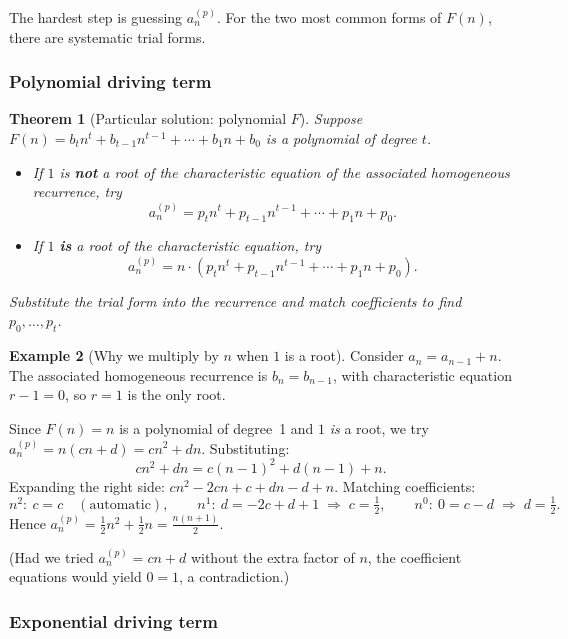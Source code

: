 \documentclass[11pt, a4paper, notitlepage]{report}
\newtheorem{theorem}{Theorem}[section]
\theoremstyle{definition}
\newtheorem{example}[theorem]{Example}
\theoremstyle{remark}
\begin{document}
The hardest step is guessing $a_n^{(p)}$.  For the two most common forms of $F(n)$,
there are systematic trial forms.

\subsubsection{Polynomial driving term}

\begin{theorem}[Particular solution: polynomial $F$]
\label{thm:particular-poly}
Suppose $F(n) = b_t n^t + b_{t-1}n^{t-1} + \cdots + b_1 n + b_0$ is a polynomial of
degree $t$.
\begin{itemize}
  \item If $1$ is \textbf{not} a root of the characteristic equation of the associated
        homogeneous recurrence, try
        \[a_n^{(p)} = p_t n^t + p_{t-1}n^{t-1} + \cdots + p_1 n + p_0.\]
  \item If $1$ \textbf{is} a root of the characteristic equation, try
        \[a_n^{(p)} = n\cdot(p_t n^t + p_{t-1}n^{t-1} + \cdots + p_1 n + p_0).\]
\end{itemize}
Substitute the trial form into the recurrence and match coefficients to find $p_0, \ldots, p_t$.
\end{theorem}

\begin{example}[Why we multiply by $n$ when $1$ is a root]
\label{ex:root1}
Consider $a_n = a_{n-1} + n$.  The associated homogeneous recurrence is $b_n = b_{n-1}$,
with characteristic equation $r - 1 = 0$, so $r = 1$ is the only root.

Since $F(n) = n$ is a polynomial of degree~1 and $1$ \emph{is} a root, we try
$a_n^{(p)} = n(cn + d) = cn^2 + dn$.  Substituting:
\[
  cn^2 + dn = c(n-1)^2 + d(n-1) + n.
\]
Expanding the right side: $cn^2 - 2cn + c + dn - d + n$.  Matching coefficients:
\[
  n^2{:}\ c = c \quad(\text{automatic}),\qquad
  n^1{:}\ d = -2c + d + 1 \;\Rightarrow\; c = \tfrac{1}{2},\qquad
  n^0{:}\ 0 = c - d \;\Rightarrow\; d = \tfrac{1}{2}.
\]
Hence $a_n^{(p)} = \tfrac{1}{2}n^2 + \tfrac{1}{2}n = \tfrac{n(n+1)}{2}$.

(Had we tried $a_n^{(p)} = cn + d$ without the extra factor of $n$, the coefficient
equations would yield $0 = 1$, a contradiction.)
\end{example}

\subsubsection{Exponential driving term}
\end{document}
